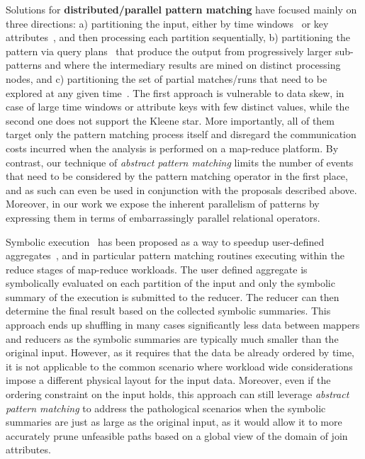 Solutions for \textbf{distributed/parallel pattern matching} have focused 
mainly on three directions:
a)
partitioning the input, either by time windows~\cite{Leghari:2015} or key 
attributes~\cite{Hirzel:2012}, and then processing each partition  
sequentially,
b) 
partitioning the pattern via query plans~\cite{Akdere:2008} that produce the 
output from 
progressively larger sub-patterns and 
where the intermediary results are mined on distinct processing nodes,
and 
c)
partitioning the set of partial matches/runs that need to be explored at any 
given time~\cite{Balkesen:2013}.  
The first approach is vulnerable to data skew, in case of large time windows or 
attribute keys with few distinct values, 
while the second one does not support the Kleene star.
More importantly, all of them target only the pattern matching process 
itself and disregard the communication costs incurred when the analysis is 
performed on a map-reduce platform.
By contrast,
our technique of {\em abstract pattern matching}
limits the number of events that need to be considered by the pattern 
matching operator in the first place, and as such can even be used in 
conjunction with the proposals described above.
Moreover,
in our work we expose the inherent parallelism of patterns by expressing them 
in terms of embarrassingly parallel relational operators.  

Symbolic execution~\cite{King:1976} has been proposed as a way to speedup 
 user-defined aggregates~\cite{Raychev:2015}, and in particular 
pattern matching routines executing within the reduce stages of map-reduce 
workloads.    
The user defined aggregate is symbolically evaluated on each 
partition of the input and only the symbolic summary of the 
execution is submitted  to the reducer. 
The reducer can then determine the final result based on the collected symbolic 
summaries. 
This approach ends up shuffling in many cases significantly less data between 
mappers and reducers as the symbolic summaries are typically much smaller than 
the original input.
However, as it requires that the data be already ordered by time, it is not 
applicable to the common scenario where workload wide considerations impose a 
different physical layout for the input data.  
Moreover, even if the ordering constraint on the input holds, this approach can 
still leverage {\em abstract pattern matching} to address
the pathological scenarios when the symbolic summaries are just as large as the 
original input, as it would allow it to more accurately prune unfeasible paths 
based on a global view of the domain of join attributes. 



